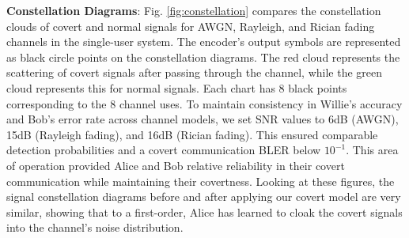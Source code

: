 \textbf{Constellation Diagrams}: Fig. \ref{fig:constellation} compares the constellation clouds of covert and normal signals for AWGN, Rayleigh, and Rician fading channels in the single-user system. The encoder's output symbols are represented as black circle points on the constellation diagrams. The red cloud represents the scattering of covert signals after passing through the channel, while the green cloud represents this for normal signals. Each chart has 8 black points corresponding to the 8 channel uses. To maintain consistency in Willie's accuracy and Bob's error rate across channel models, we set SNR values to 6dB (AWGN), 15dB (Rayleigh fading), and 16dB (Rician fading). This ensured comparable detection probabilities and a covert communication BLER below \(10^{-1}\). This area of operation provided Alice and Bob relative reliability in their covert communication while maintaining their covertness.
Looking at these figures, the signal constellation diagrams before and after applying our covert model are very similar, showing that to a first-order, Alice has learned to cloak the covert signals into the channel's noise distribution.


